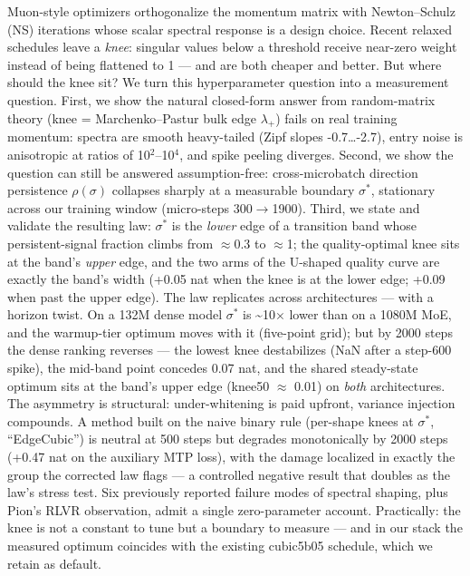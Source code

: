\documentclass[
]{article}
\begin{document}
Muon-style optimizers orthogonalize the momentum matrix with
Newton--Schulz (NS) iterations whose scalar spectral response is a
design choice. Recent relaxed schedules leave a \emph{knee}: singular
values below a threshold receive near-zero weight instead of being
flattened to 1 --- and are both cheaper and better. But where should the
knee sit? We turn this hyperparameter question into a measurement
question. First, we show the natural closed-form answer from
random-matrix theory (knee = Marchenko--Pastur bulk edge \(\lambda_+\))
fails on real training momentum: spectra are smooth heavy-tailed (Zipf
slopes -0.7\ldots-2.7), entry noise is anisotropic at ratios of
10\(^2\)--10\(^4\), and spike peeling diverges. Second, we show the
question can still be answered assumption-free: cross-microbatch
direction persistence \(\rho(\sigma)\) collapses sharply at a measurable
boundary \(\sigma^*\), stationary across our training window
(micro-steps 300\(\to\){}1900). Third, we state and validate the
resulting law: \(\sigma^*\) is the \emph{lower} edge of a transition
band whose persistent-signal fraction climbs from \(\approx\){}0.3 to
\(\approx\){}1; the quality-optimal knee sits at the band's
\emph{upper} edge, and the two arms of the U-shaped quality curve are
exactly the band's width (+0.05 nat when the knee is at the lower edge;
+0.09 when past the upper edge). The law replicates across architectures
--- with a horizon twist. On a 132M dense model \(\sigma^*\) is
\textasciitilde10\(\times\) lower than on a 1080M MoE, and the
warmup-tier optimum moves with it (five-point grid); but by 2000 steps
the dense ranking reverses --- the lowest knee destabilizes (NaN after a
step-600 spike), the mid-band point concedes 0.07 nat, and the shared
steady-state optimum sits at the band's upper edge (knee50 \(\approx\)
0.01) on \emph{both} architectures. The asymmetry is structural:
under-whitening is paid upfront, variance injection compounds. A method
built on the naive binary rule (per-shape knees at \(\sigma^*\),
``EdgeCubic'') is neutral at 500 steps but degrades monotonically by
2000 steps (+0.47 nat on the auxiliary MTP loss), with the damage
localized in exactly the group the corrected law flags --- a controlled
negative result that doubles as the law's stress test. Six previously
reported failure modes of spectral shaping, plus Pion's RLVR
observation, admit a single zero-parameter account. Practically: the
knee is not a constant to tune but a boundary to measure --- and in our
stack the measured optimum coincides with the existing cubic5b05
schedule, which we retain as default.
\end{document}
